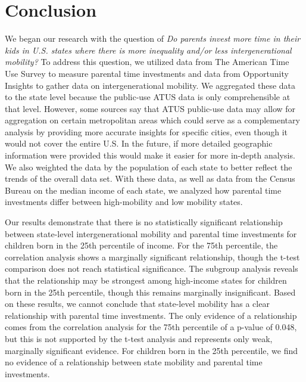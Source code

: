 \documentclass[12pt]{article}
\begin{document}
    \setlength{\pdfpagewidth}{8.5in} \setlength{\pdfpageheight}{11in}


\section{Conclusion}
\label{sec:conclusion}

We began our research with the question of \textit{Do parents invest more time in their kids in U.S. states where there is more inequality and/or less intergenerational mobility?}  To address this question, we utilized data from The American Time Use Survey to measure parental time investments and data from Opportunity Insights to gather data on intergenerational mobility. We aggregated these data to the state level because the public-use ATUS data is only comprehensible at that level. However, some sources say that ATUS public-use data may allow for aggregation on certain metropolitan areas which could serve as a complementary analysis by providing more accurate insights for specific cities, even though it would not cover the entire U.S. In the future, if more detailed geographic information were provided this would make it easier for more in-depth analysis. We also weighted the data by the population of each state to better reflect the trends of the overall data set. With these data, as well as data from the Census Bureau on the median income of each state, we analyzed how parental time investments differ between high-mobility and low mobility states.

Our results demonstrate that there is no statistically significant relationship between state-level intergenerational mobility and parental time investments for children born in the 25th percentile of income. For the 75th percentile, the correlation analysis shows a marginally significant relationship, though the t-test comparison does not reach statistical significance. The subgroup analysis reveals that the relationship may be strongest among high-income states for children born in the 25th percentile, though this remains marginally insignificant. Based on these results, we cannot conclude that state-level mobility has a clear relationship with parental time investments. The only evidence of a relationship comes from the correlation analysis for the 75th percentile of a p-value of 0.048, but this is not supported by the t-test analysis and represents only weak, marginally significant evidence. For children born in the 25th percentile, we find no evidence of a relationship between state mobility and parental time investments.
\end{document}
